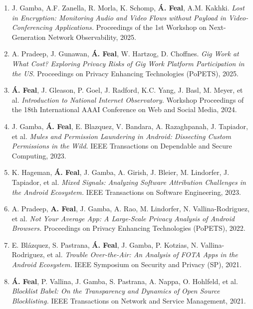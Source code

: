 \documentclass[11pt,a4paper,sans]{moderncv}        %
\begin{document}
\begin{enumerate}
\item J. Gamba, A.F. Zanella, R. Morla, K. Schomp, \textbf{Á. Feal}, A.M. Kakhki. \textit{Lost in Encryption: Monitoring Audio and Video Flows without Payload in Video-Conferencing Applications.} Proceedings of the 1st Workshop on Next-Generation Network Observability, 2025.

\item A. Pradeep, J. Gunawan, \textbf{Á. Feal}, W. Hartzog, D. Choffnes. \textit{Gig Work at What Cost? Exploring Privacy Risks of Gig Work Platform Participation in the US.} Proceedings on Privacy Enhancing Technologies (PoPETS), 2025.

\item \textbf{Á. Feal}, J. Gleason, P. Goel, J. Radford, K.C. Yang, J. Basl, M. Meyer, et al. \textit{Introduction to National Internet Observatory.} Workshop Proceedings of the 18th International AAAI Conference on Web and Social Media, 2024.

\item J. Gamba, \textbf{Á. Feal}, E. Blazquez, V. Bandara, A. Razaghpanah, J. Tapiador, et al. \textit{Mules and Permission Laundering in Android: Dissecting Custom Permissions in the Wild.} IEEE Transactions on Dependable and Secure Computing, 2023.

\item K. Hageman, \textbf{Á. Feal}, J. Gamba, A. Girish, J. Bleier, M. Lindorfer, J. Tapiador, et al. \textit{Mixed Signals: Analyzing Software Attribution Challenges in the Android Ecosystem.} IEEE Transactions on Software Engineering, 2023.

\item A. Pradeep, \textbf{A. Feal}, J. Gamba, A. Rao, M. Lindorfer, N. Vallina-Rodriguez, et al. \textit{Not Your Average App: A Large-Scale Privacy Analysis of Android Browsers.} Proceedings on Privacy Enhancing Technologies (PoPETS), 2022.

\item E. Blázquez, S. Pastrana, \textbf{Á. Feal}, J. Gamba, P. Kotzias, N. Vallina-Rodriguez, et al. \textit{Trouble Over-the-Air: An Analysis of FOTA Apps in the Android Ecosystem.} IEEE Symposium on Security and Privacy (SP), 2021.

\item \textbf{Á. Feal}, P. Vallina, J. Gamba, S. Pastrana, A. Nappa, O. Hohlfeld, et al. \textit{Blocklist Babel: On the Transparency and Dynamics of Open Source Blocklisting.} IEEE Transactions on Network and Service Management, 2021.


\end{enumerate}
\end{document}

